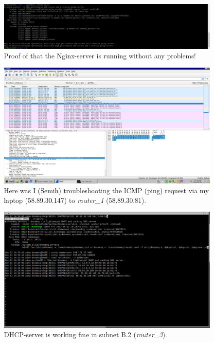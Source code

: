 \documentclass[a4paper,1pt]{article}
\begin{document}
\begin{figure}[H]
	\centering
	\includegraphics[width=\textwidth]{n3.jpg}
	\caption{Proof of that the Nginx-server is running without any problems!}
	\label{fig:n3}
\end{figure}

\begin{figure}[H]
	\centering
	\includegraphics[width=\textwidth]{ws.png}
	\caption{Here was I (Semih) troubleshooting the ICMP (ping) request via my laptop (58.89.30.147) to \textit{router\_1} (58.89.30.81).}
	\label{fig:ws}
\end{figure}

\begin{figure}[H]
	\centering
	\includegraphics[width=\textwidth]{dhcp.png}
	\caption{DHCP-server is working fine in subnet B.2 (\textit{router\_3}).}
	\label{fig:dhcp}
\end{figure}
\end{document}
